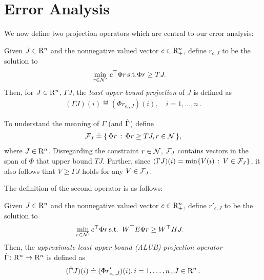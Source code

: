 \section{Error Analysis}\label{sec:errana}
We now define two projection operators which are central to our error analysis:
\begin{definition}\label{lubpop}
Given $J\in \mathrm{R}^n$ and the nonnegative valued vector $c\in \mathrm{R}^n_+$, define $r_{c,J}$ to be the solution to 
\begin{align}
\label{lubplp}
\begin{split}
 \underset{r\in \N'}{\min} &\,\, c^\top \Phi r\,\mb
 \text{s.t.} \mb \Phi r\geq  TJ.
 \end{split}
\end{align}
Then, for $J\in \mathrm{R}^n$, $\Gamma J$,
the \emph{ least upper bound projection} of $J$ is defined as 
\begin{align}\label{gamdef}
(\Gamma J)(i)\eqdef(\Phi r_{e_i,J})(i),\quad i=1,\ldots,n\,.
\end{align}
\end{definition}
\begin{remark}\label{ubrem}
To understand the meaning of $\Gamma$ (and $\hat{\Gamma}$) define 
\begin{align}\label{ubclass}
\F_J\eqdef\{\,\Phi r\,:\,\Phi r\geq TJ, r\in \N\,\},
\end{align}
where $J\in \mathrm{R}^n$. 
Disregarding the constraint $r\in \mathcal{N}$, 
$\mathcal{F}_J$ contains vectors in the span of $\Phi$ that upper bound $TJ$. Further, since $(\Gamma J)(i) = \min\{ V(i) \,:\, V\in \mathcal{F}_J \}$, it also follows that $ V\ge \Gamma J $ holds for any $V\in \mathcal{F}_J$.
\end{remark}
The definition of the second operator is as follows:
\begin{definition}\label{alubpop}
Given $J\in \mathrm{R}^n$ and the nonnegative valued vector $c\in \mathrm{R}^n_+$, define $r'_{c,J}$ to be the solution to 
\begin{align}\label{alubplp}
 \underset{r\in \N'}{\min}& \,\mb c^\top \Phi r\,\mb
 \text{s.t.} \,\,\, W^\top E \Phi r\geq W^\top HJ.
\end{align}
Then, the \emph{approximate least upper bound (ALUB) projection operator}
$\hat{\Gamma} \colon \mathrm{R}^n \rightarrow \mathrm{R}^n$ is defined as 
\begin{align}\label{tgamdef}
(\hg J)(i)\eqdef(\Phi r'_{e_i,J})(i), \mb i=1,\ldots,n\,, J\in \R^n\,.
\end{align}
\end{definition}
